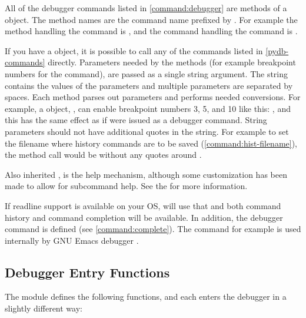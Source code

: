 All of the debugger commands listed in \ref{command:debugger} are methods
of a  object. The method names are the command name prefixed by
. For example the method handling the  command is
, and the command handling the  command is
. 

If you have a  object, it is possible to call any of the
commands listed in \ref{pydb-commands} directly. Parameters needed by
the methods (for example breakpoint numbers for the 
command), are passed as a single string argument. The string contains
the values of the parameters and multiple parameters are separated by
spaces. Each method parses out parameters and performs needed
conversions.  For example, a  object, , can enable
breakpoint numbers 3, 5, and 10 like this: , and this has the same effect as if  were
issued as a debugger command. String parameters should not have
additional quotes in the string. For example to set the filename where
history commands are to be saved (\ref{command:hist-filename}), the
method call would be  without any quotes around .

Also inherited , is the help mechanism, although some
customization has been made to allow for subcommand help.  See the
for more information.

If readline support is available on your OS,  will use that
and both command history and command completion will be available. In
addition, the debugger  command is defined (see
\ref{command:complete}). The  command for example is
used internally by GNU Emacs debugger .

\subsection{Debugger Entry Functions}\label{entry-fns}

The  module defines the following functions, and each enters
the debugger in a slightly different way:

